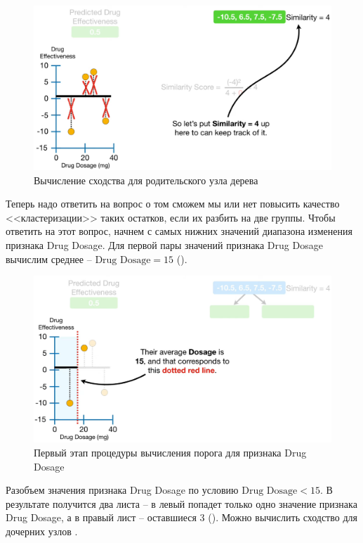 \documentclass[%
	11pt,
	a4paper,
	utf8,
		]{article}
\begin{document}
\begin{figure}[h]
	\centering
	\includegraphics[scale=0.35]{figures/xgboost_similarity_4root.png}
	\caption{ Вычисление сходства для родительского узла дерева }\label{fig:xgboost_similarity_4root}
\end{figure}

Теперь надо ответить на вопрос о том сможем мы или нет повысить качество <<кластеризации>> таких остатков, если их разбить на две группы. Чтобы ответить на этот вопрос, начнем с самых нижних значений диапазона изменения признака Drug Dosage. Для первой пары значений признака Drug Dosage вычислим среднее -- $ \text{Drug Dosage} = 15 $ ().

\begin{figure}[h]
	\centering
	\includegraphics[scale=0.35]{figures/xgboost_dosage1.png}
	\caption{ Первый этап процедуры вычисления порога для признака Drug Dosage }\label{fig:xgboost_dosage1}
\end{figure}

Разобъем значения признака Drug Dosage по условию $ \text{Drug Dosage} < 15 $. В результате получится два листа -- в левый попадет только одно значение признака Drug Dosage, а в правый лист -- оставшиеся 3 (). Можно вычислить сходство для дочерних узлов .
\end{document}
